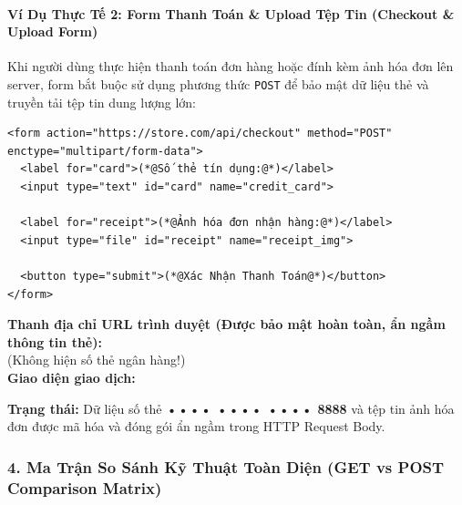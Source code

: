 \documentclass[11pt,oneside]{book}
\newcommand{\codeinline}[1]{\textcolor{accentOrange}{\texttt{#1}}}
\begin{document}
\paragraph{Ví Dụ Thực Tế 2: Form Thanh Toán \& Upload Tệp Tin (Checkout \& Upload Form)}
Khi người dùng thực hiện thanh toán đơn hàng hoặc đính kèm ảnh hóa đơn lên server, form bắt buộc sử dụng phương thức \codeinline{POST} để bảo mật dữ liệu thẻ và truyền tải tệp tin dung lượng lớn:

\begin{codeWindowBreakable}
\begin{lstlisting}[language=HTML5]
<form action="https://store.com/api/checkout" method="POST" enctype="multipart/form-data">
  <label for="card">(*@Số thẻ tín dụng:@*)</label>
  <input type="text" id="card" name="credit_card">

  <label for="receipt">(*@Ảnh hóa đơn nhận hàng:@*)</label>
  <input type="file" id="receipt" name="receipt_img">

  <button type="submit">(*@Xác Nhận Thanh Toán@*)</button>
</form>
\end{lstlisting}
\end{codeWindowBreakable}

\begin{browserWindow}
\sffamily\small
\textbf{Thanh địa chỉ URL trình duyệt (Được bảo mật hoàn toàn, ẩn ngầm thông tin thẻ):} \\[3pt]
 \;\textcolor{codeComment}{(Không hiện số thẻ ngân hàng!)} \\[8pt]
\textbf{Giao diện giao dịch:} \\[4pt]
\begin{tcolorbox}[colback=white, colframe=secondaryTeal!20, arc=4pt, boxrule=0.6pt, left=8pt, right=8pt, top=6pt, bottom=6pt]
  \textcolor{darkText}{\textbf{Trạng thái:}} Dữ liệu số thẻ \textbf{•••• •••• •••• 8888} và tệp tin ảnh hóa đơn được mã hóa và đóng gói ẩn ngầm trong HTTP Request Body.
\end{tcolorbox}
\end{browserWindow}

\subsubsection{4. Ma Trận So Sánh Kỹ Thuật Toàn Diện (GET vs POST Comparison Matrix)}
\end{document}
